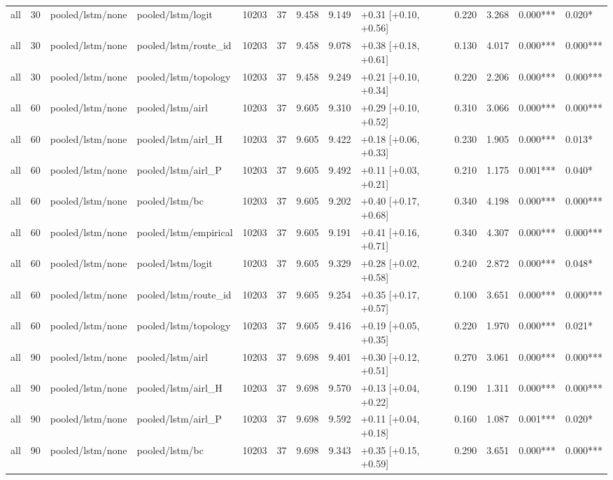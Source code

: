 \begin{tabular}{lrllrrrrlrrll}
all & 30 & pooled/lstm/none & pooled/lstm/logit & 10203 & 37 & 9.458 & 9.149 & +0.31 [+0.10, +0.56] & 0.220 & 3.268 & 0.000*** & 0.020* \\
all & 30 & pooled/lstm/none & pooled/lstm/route_id & 10203 & 37 & 9.458 & 9.078 & +0.38 [+0.18, +0.61] & 0.130 & 4.017 & 0.000*** & 0.000*** \\
all & 30 & pooled/lstm/none & pooled/lstm/topology & 10203 & 37 & 9.458 & 9.249 & +0.21 [+0.10, +0.34] & 0.220 & 2.206 & 0.000*** & 0.000*** \\
all & 60 & pooled/lstm/none & pooled/lstm/airl & 10203 & 37 & 9.605 & 9.310 & +0.29 [+0.10, +0.52] & 0.310 & 3.066 & 0.000*** & 0.000*** \\
all & 60 & pooled/lstm/none & pooled/lstm/airl_H & 10203 & 37 & 9.605 & 9.422 & +0.18 [+0.06, +0.33] & 0.230 & 1.905 & 0.000*** & 0.013* \\
all & 60 & pooled/lstm/none & pooled/lstm/airl_P & 10203 & 37 & 9.605 & 9.492 & +0.11 [+0.03, +0.21] & 0.210 & 1.175 & 0.001*** & 0.040* \\
all & 60 & pooled/lstm/none & pooled/lstm/bc & 10203 & 37 & 9.605 & 9.202 & +0.40 [+0.17, +0.68] & 0.340 & 4.198 & 0.000*** & 0.000*** \\
all & 60 & pooled/lstm/none & pooled/lstm/empirical & 10203 & 37 & 9.605 & 9.191 & +0.41 [+0.16, +0.71] & 0.340 & 4.307 & 0.000*** & 0.000*** \\
all & 60 & pooled/lstm/none & pooled/lstm/logit & 10203 & 37 & 9.605 & 9.329 & +0.28 [+0.02, +0.58] & 0.240 & 2.872 & 0.000*** & 0.048* \\
all & 60 & pooled/lstm/none & pooled/lstm/route_id & 10203 & 37 & 9.605 & 9.254 & +0.35 [+0.17, +0.57] & 0.100 & 3.651 & 0.000*** & 0.000*** \\
all & 60 & pooled/lstm/none & pooled/lstm/topology & 10203 & 37 & 9.605 & 9.416 & +0.19 [+0.05, +0.35] & 0.220 & 1.970 & 0.000*** & 0.021* \\
all & 90 & pooled/lstm/none & pooled/lstm/airl & 10203 & 37 & 9.698 & 9.401 & +0.30 [+0.12, +0.51] & 0.270 & 3.061 & 0.000*** & 0.000*** \\
all & 90 & pooled/lstm/none & pooled/lstm/airl_H & 10203 & 37 & 9.698 & 9.570 & +0.13 [+0.04, +0.22] & 0.190 & 1.311 & 0.000*** & 0.000*** \\
all & 90 & pooled/lstm/none & pooled/lstm/airl_P & 10203 & 37 & 9.698 & 9.592 & +0.11 [+0.04, +0.18] & 0.160 & 1.087 & 0.001*** & 0.020* \\
all & 90 & pooled/lstm/none & pooled/lstm/bc & 10203 & 37 & 9.698 & 9.343 & +0.35 [+0.15, +0.59] & 0.290 & 3.651 & 0.000*** & 0.000*** \\

\end{tabular}
